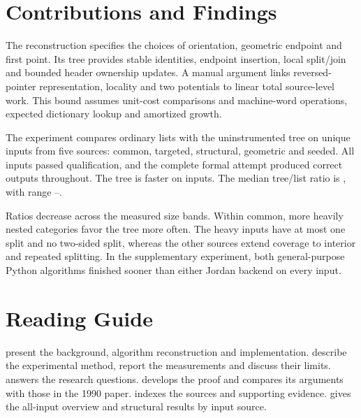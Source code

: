 \section{Contributions and Findings}
\label{sec:introduction-contributions}
\label{sec:introduction-findings}

The reconstruction specifies the choices of orientation, geometric endpoint
and first point. Its tree provides stable identities, endpoint insertion,
local split/join and bounded header ownership updates. A manual argument links
reversed-pointer representation, locality and two potentials to linear total
source-level work. This bound assumes unit-cost comparisons and machine-word
operations, expected dictionary lookup and amortized growth.

The experiment compares ordinary lists with the uninstrumented tree on
\UnifiedN{} unique inputs from five sources: common, targeted, structural,
geometric and seeded. All inputs passed qualification, and the complete
formal attempt produced correct outputs throughout. The tree is faster on
\UnifiedWins{} inputs. The median tree/list ratio is \UnifiedMedian{}, with
range \UnifiedMinimum{}--\UnifiedMaximum{}.

Ratios decrease across the measured size bands. Within common, more heavily nested categories favor the tree more
often. The heavy inputs have at most one split and no two-sided split, whereas
the other sources extend coverage to interior and repeated splitting.
In the supplementary experiment, both general-purpose Python algorithms
finished sooner than either Jordan backend on every input.

\section{Reading Guide}
\label{sec:introduction-structure}

 present the background,
algorithm reconstruction and implementation. 
describe the experimental method, report the measurements and discuss their
limits.  answers the research questions.
 develops the proof and compares its arguments with
those in the 1990 paper.  indexes the sources and
supporting evidence.  gives the all-input overview
and structural results by input source.
